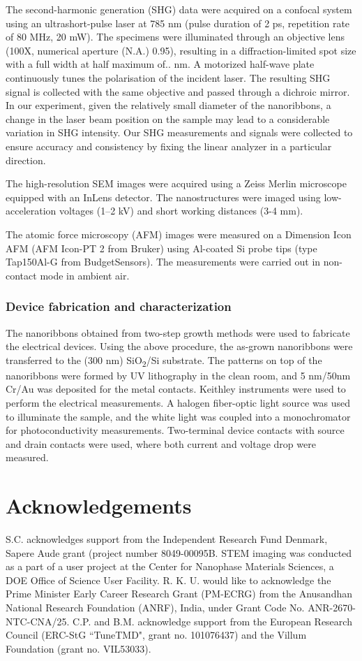 \documentclass[journal=jacsnano,manuscript=article]{achemso}
\begin{document}
The second-harmonic generation (SHG) data were acquired on a confocal system using an ultrashort-pulse laser at 785 nm (pulse duration of 2 ps, repetition rate of 80 MHz, 20 mW). The specimens were illuminated through an objective lens (100X, numerical aperture (N.A.) 0.95), resulting in a diffraction-limited spot size with a full width at half maximum of.. nm. A motorized half-wave plate continuously tunes the polarisation of the incident laser. The resulting SHG signal is collected with the same objective and passed through a dichroic mirror. In our experiment, given the relatively small diameter of the  nanoribbons, a change in the laser beam position on the sample may lead to a considerable variation in SHG intensity. Our SHG measurements and signals were collected to ensure accuracy and consistency by fixing the linear analyzer in a particular direction. 

The high-resolution SEM images were acquired using a Zeiss Merlin microscope equipped with an InLens detector. The nanostructures were imaged using low-acceleration voltages (1–2 kV) and short working distances (3-4 mm).

The atomic force microscopy (AFM) images were measured on a Dimension Icon AFM (AFM Icon-PT 2 from Bruker) using  Al-coated Si probe tips (type Tap150Al-G from BudgetSensors). The measurements were carried out in non-contact mode in ambient air. 


\subsubsection{Device fabrication and characterization}
The  nanoribbons obtained from two-step growth methods were used to fabricate the electrical devices. Using the above procedure, the as-grown  nanoribbons were transferred to the (300 nm) SiO\textsubscript{2}/Si substrate. The patterns on top of the nanoribbons were formed by UV lithography in the clean room, and 5 nm/50nm Cr/Au was deposited for the metal contacts. Keithley instruments were used to perform the electrical measurements. A halogen fiber-optic light source was used to illuminate the sample, and the white light was coupled into a monochromator for photoconductivity measurements. Two-terminal device contacts with source and drain contacts were used, where both current and voltage drop were measured. 

\section{Acknowledgements}
 S.C. acknowledges support from the Independent Research Fund Denmark, Sapere Aude grant (project number 8049-00095B. STEM imaging was conducted as a part of a user project at the Center for Nanophase Materials Sciences, a DOE Office of Science User Facility. R. K. U. would like to acknowledge the Prime Minister Early Career
Research Grant (PM-ECRG) from the Anusandhan National Research Foundation (ANRF),
India, under Grant Code No. ANR-2670-NTC-CNA/25. C.P. and B.M. acknowledge support from the European Research Council (ERC-StG ``TuneTMD", grant no. 101076437) and the Villum Foundation (grant no. VIL53033).
\end{document}

